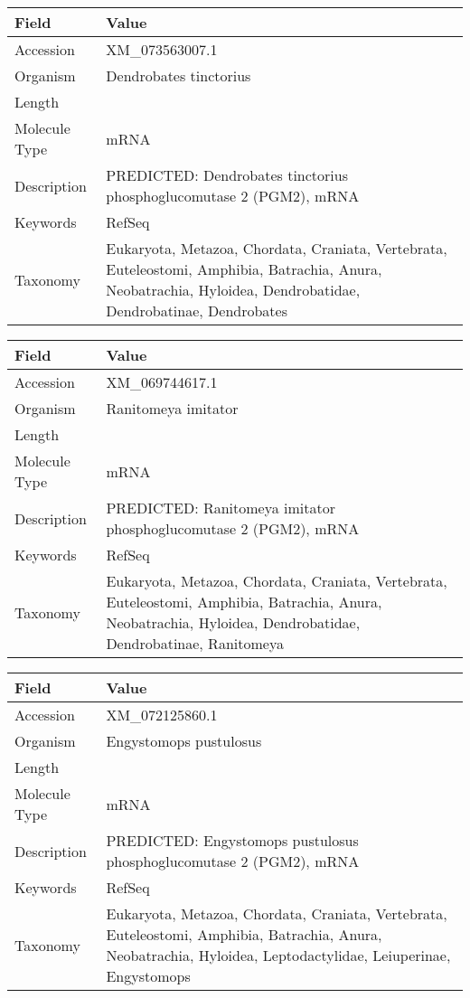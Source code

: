 \documentclass[10pt]{article}
\begin{document}
{\footnotesize
\begin{longtable}{>{\raggedright\arraybackslash}p{4.5cm} >{\raggedright\arraybackslash}p{11.5cm}}
\textbf{Field} & \textbf{Value} \\
\hline
Accession & XM\_073563007.1 \\
Organism & Dendrobates tinctorius \\
Length & 2226 \\
Molecule Type & mRNA \\
Description & PREDICTED: Dendrobates tinctorius phosphoglucomutase 2 (PGM2), mRNA \\
Keywords & RefSeq \\
Taxonomy & Eukaryota, Metazoa, Chordata, Craniata, Vertebrata, Euteleostomi, Amphibia, Batrachia, Anura, Neobatrachia, Hyloidea, Dendrobatidae, Dendrobatinae, Dendrobates \\
\end{longtable}
}

{\footnotesize
\begin{longtable}{>{\raggedright\arraybackslash}p{4.5cm} >{\raggedright\arraybackslash}p{11.5cm}}
\textbf{Field} & \textbf{Value} \\
\hline
Accession & XM\_069744617.1 \\
Organism & Ranitomeya imitator \\
Length & 2750 \\
Molecule Type & mRNA \\
Description & PREDICTED: Ranitomeya imitator phosphoglucomutase 2 (PGM2), mRNA \\
Keywords & RefSeq \\
Taxonomy & Eukaryota, Metazoa, Chordata, Craniata, Vertebrata, Euteleostomi, Amphibia, Batrachia, Anura, Neobatrachia, Hyloidea, Dendrobatidae, Dendrobatinae, Ranitomeya \\
\end{longtable}
}

{\footnotesize
\begin{longtable}{>{\raggedright\arraybackslash}p{4.5cm} >{\raggedright\arraybackslash}p{11.5cm}}
\textbf{Field} & \textbf{Value} \\
\hline
Accession & XM\_072125860.1 \\
Organism & Engystomops pustulosus \\
Length & 2267 \\
Molecule Type & mRNA \\
Description & PREDICTED: Engystomops pustulosus phosphoglucomutase 2 (PGM2), mRNA \\
Keywords & RefSeq \\
Taxonomy & Eukaryota, Metazoa, Chordata, Craniata, Vertebrata, Euteleostomi, Amphibia, Batrachia, Anura, Neobatrachia, Hyloidea, Leptodactylidae, Leiuperinae, Engystomops \\
\end{longtable}
}
\end{document}
